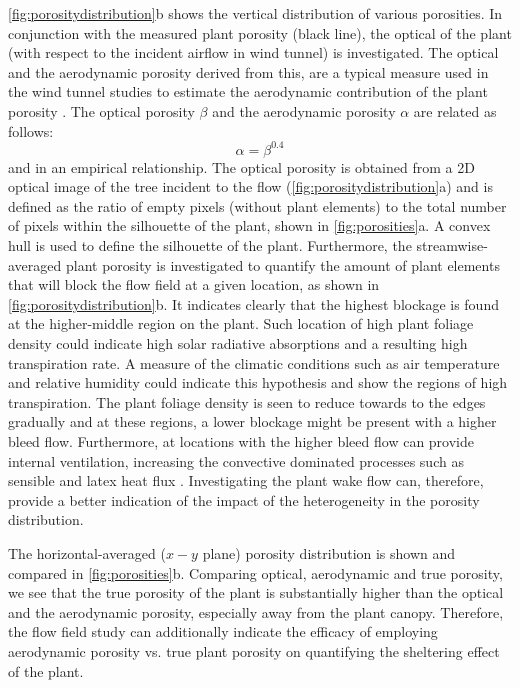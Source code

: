 \cref{fig:porositydistribution}b shows the vertical distribution of various porosities. In conjunction with the measured plant porosity (black line), the optical of the plant (with respect to the incident airflow in wind tunnel) is investigated. The optical and the aerodynamic porosity derived from this, are a typical measure used in the wind tunnel studies to estimate the aerodynamic contribution of the plant porosity \citep{Grant1998, Guan2003, Manickathan2018b}. The optical porosity $\beta$ and the aerodynamic porosity $\alpha$ are related as follows:
\begin{equation}
\alpha = \beta^{0.4}
\end{equation}
and in an empirical relationship. The optical porosity is obtained from a 2D optical image of the tree incident to the flow (\cref{fig:porositydistribution}a) and is defined as the ratio of empty pixels (without plant elements) to the total number of pixels within the silhouette of the plant, shown in  \cref{fig:porosities}a. A convex hull is used to define the silhouette of the plant. Furthermore, the streamwise-averaged plant porosity is investigated to quantify the amount of plant elements that will block the flow field at a given location, as shown in \cref{fig:porositydistribution}b. It indicates clearly that the highest blockage is found at the higher-middle region on the plant. Such location of high plant foliage density could indicate high solar radiative absorptions and a resulting high transpiration rate. A measure of the climatic conditions such as air temperature and relative humidity could indicate this hypothesis and show the regions of high transpiration. The plant foliage density is seen to reduce towards to the edges gradually and at these regions, a lower blockage might be present with a higher bleed flow. Furthermore, at locations with the higher bleed flow can provide internal ventilation, increasing the convective dominated processes such as sensible and latex heat flux \citep{Manickathan2018a}. Investigating the plant wake flow can, therefore, provide a better indication of the impact of the heterogeneity in the porosity distribution.

The horizontal-averaged ($x-y$ plane) porosity distribution is shown and compared in \cref{fig:porosities}b. Comparing optical, aerodynamic and true porosity, we see that the true porosity of the plant is substantially higher than the optical and the aerodynamic porosity, especially away from the plant canopy. Therefore, the flow field study can additionally indicate the efficacy of employing aerodynamic porosity vs. true plant porosity on quantifying the sheltering effect of the plant. 

